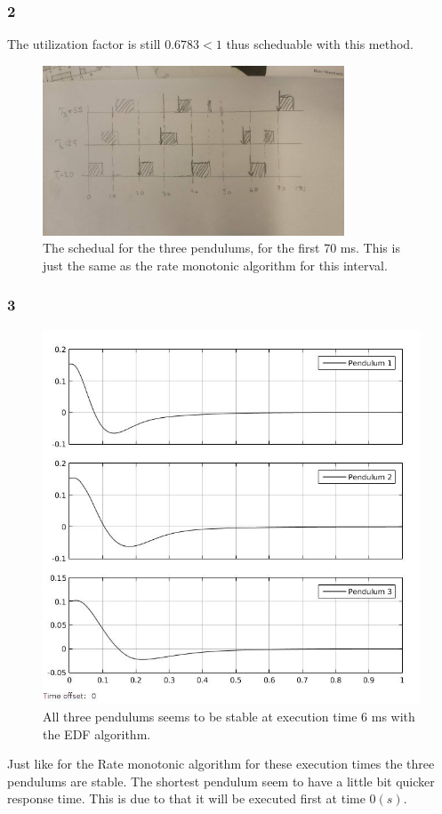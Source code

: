 \documentclass[10pt,a4paper]{article}
\begin{document}
\subsubsection*{2}  
The utilization factor is still $0.6783<1$ thus scheduable with this method.
\begin{figure}[!h]
  \centering
    \includegraphics[width=0.8\textwidth]{egen.jpg}
      \caption{The schedual for the three pendulums, for the first 70 ms. This is just the same as the rate monotonic algorithm for this interval.}
\end{figure}
\subsubsection*{3}
\begin{figure}[!ht]
  \centering
    \includegraphics[width=1\textwidth]{6msedf.jpg}
      \caption{All three pendulums seems to be stable at execution time 6 ms with the EDF algorithm.}
\end{figure}
Just like for the Rate monotonic algorithm for these execution times the three pendulums are stable. The shortest pendulum seem to have a little bit quicker response time. This is due to that it will be executed first at time $0(s)$. 
\end{document}
